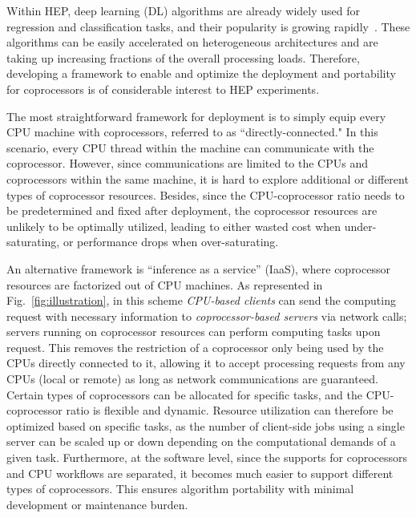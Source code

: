 Within HEP, deep learning (DL) algorithms are already widely used for regression and classification tasks, and their popularity is growing rapidly~\cite{Guest:2018yhq, Albertsson:2018maf, Bourilkov:2019yoi, Larkoski:2017jix}. These algorithms can be easily accelerated on heterogeneous architectures and are taking up increasing fractions of the overall processing loads. Therefore, developing a framework to enable and optimize the deployment and portability for coprocessors is of considerable interest to HEP experiments.

The most straightforward framework for deployment is to simply equip every CPU machine with coprocessors, referred to as ``directly-connected." In this scenario, every CPU thread within the machine can communicate with the coprocessor. However, since communications are limited to the CPUs and coprocessors within the same machine, it is hard to explore additional or different types of coprocessor resources. Besides, since the CPU-coprocessor ratio needs to be predetermined and fixed after deployment, the coprocessor resources are unlikely to be optimally utilized, leading to either wasted cost when under-saturating, or performance drops when over-saturating.

An alternative framework is ``inference as a service'' (IaaS), where coprocessor resources are factorized out of CPU machines. As represented in Fig.~\ref{fig:illustration}, in this scheme \emph{CPU-based clients} can send the computing request with necessary information to \emph{coprocessor-based servers} via network calls; servers running on coprocessor resources can perform computing tasks upon request. This removes the restriction of a coprocessor only being used by the CPUs directly connected to it, allowing it to accept processing requests from any CPUs (local or remote) as long as network communications are guaranteed. Certain types of coprocessors can be allocated for specific tasks, and the CPU-coprocessor ratio is flexible and dynamic. Resource utilization can therefore be optimized based on specific tasks, as the number of client-side jobs using a single server can be scaled up or down depending on the computational demands of a given task. Furthermore, at the software level, since the supports for coprocessors and CPU workflows are separated, it becomes much easier to support different types of coprocessors. This ensures algorithm portability with minimal development or maintenance burden.

